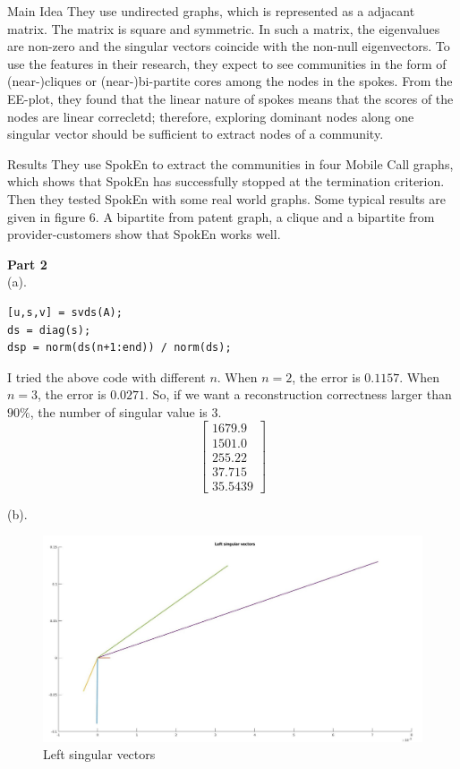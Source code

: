 \documentclass[11pt]{article}
\begin{document}
\noindent
Main Idea \newline
They use undirected graphs, which is represented as a adjacant matrix. The matrix is square and symmetric. In such a matrix, the eigenvalues are non-zero and the singular vectors coincide with the non-null eigenvectors. To use the features in their research, they expect to see communities in the form of (near-)cliques or (near-)bi-partite cores among the nodes in the spokes. From the EE-plot, they found that the linear nature of spokes means that the scores of the nodes are linear correcletd; therefore, exploring dominant nodes along one singular vector should be sufficient to extract nodes of a community.

\noindent
Results \newline
They use SpokEn to extract the communities in four Mobile Call graphs, which shows that SpokEn has successfully stopped at the termination criterion. Then they tested SpokEn with some real world graphs. Some typical results are given in figure 6. A bipartite from patent graph, a clique and a bipartite from provider-customers show that SpokEn works well.

\noindent
\textbf{Part 2} \\
(a). %
\begin{verbatim}
[u,s,v] = svds(A);
ds = diag(s);
dsp = norm(ds(n+1:end)) / norm(ds);
\end{verbatim}
I tried the above code with different $n$. When $n = 2$, the error is $0.1157$. When $n = 3$, the error is $0.0271$. So, if we want a reconstruction correctness larger than $90\%$, the number of singular value is 3.
$$
\begin{bmatrix} 
    1679.9  \\
    1501.0  \\ 
    255.22  \\
    37.715  \\
    35.5439
\end{bmatrix}
$$

\noindent
(b). 
\begin{figure}[H]
    \centering
    \includegraphics[width=\linewidth]{figs/q3.jpg}
    \caption{Left singular vectors}
    \label{fig::vec}
\end{figure}
\end{document}
